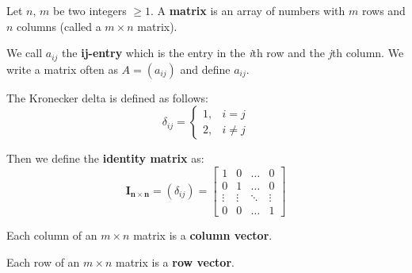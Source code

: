 \documentclass[../main.tex]{subfiles}
\begin{document}

\begin{definition}[Matrices]
    Let \( n,\, m \) be two integers \( \geq 1 \).
    A \textbf{matrix} is an array of numbers with \( m \) rows and \( n \) columns (called a \( m \times n \) matrix).
\end{definition}

\begin{definition}[ij-entry]
    We call \textbf{\( a_{ij} \)} the \textbf{ij-entry} which is the entry in the \textit{i}th row and the \textit{j}th column.
    We write a matrix often as \( A=(a_{ij}) \) and define \( a_{ij} \).
\end{definition}

\begin{example}
    The Kronecker delta is defined as follows:
    \[
        \delta_{ij} =
        \begin{cases}
            1,& i = j \\
            2,& i \neq j
        \end{cases}
    \]

    Then we define the \textbf{identity matrix} as:
    \[ \mathbf{I_{n \times n}} = (\delta_{ij}) =
        \begin{bmatrix}
            1 & 0 &  \dots  & 0 \\
            0 & 1 & \dots & 0 \\
            \vdots & \vdots & \ddots & \vdots \\
            0 & 0 & \dots  & 1
        \end{bmatrix}
    \]
\end{example}

\begin{definition}
    Each column of an \( m \times n \) matrix is a \textbf{column vector}.
\end{definition}

\begin{definition}
    Each row of an \( m \times n \) matrix is a \textbf{row vector}.
\end{definition}
\end{document}
